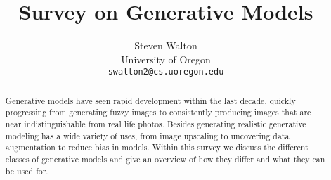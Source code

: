 \documentclass[final]{cvpr}
\begin{document}
\title{Survey on Generative Models}

\author{Steven Walton\\
University of Oregon\\

{\tt\small swalton2@cs.uoregon.edu}
}

\maketitle


\begin{abstract}
Generative models have seen rapid development within the last decade, quickly
progressing from generating fuzzy images to consistently producing images that
are near indistinguishable from real life photos. Besides generating realistic
generative modeling has a wide variety of uses, from image upscaling to
uncovering data augmentation to reduce bias in models. Within this survey we
discuss the different classes of generative models and give an overview of how
they differ and what they can be used for.
\end{abstract}








{\small

%

}
\end{document}
